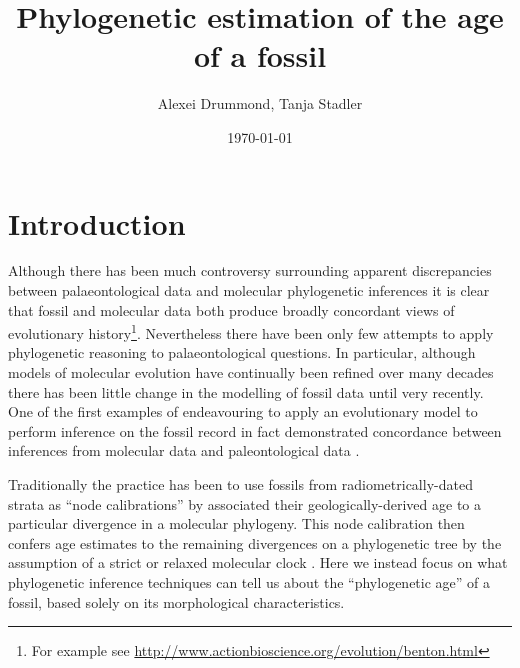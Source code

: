 \documentclass[11pt]{article}
\begin{document}
\title{Phylogenetic estimation of the age of a fossil}
\author{Alexei Drummond, Tanja Stadler}
\date{\today{}}
\maketitle

\section*{Introduction}


Although there has been much controversy surrounding apparent discrepancies between palaeontological data and molecular phylogenetic inferences it is clear that fossil and molecular data both produce broadly concordant views of evolutionary history\footnote{For example see \url{http://www.actionbioscience.org/evolution/benton.html}}. Nevertheless there have been only few attempts to apply phylogenetic reasoning to palaeontological questions. In particular, although models of molecular evolution have continually been refined over many decades there has been little change in the modelling of fossil data until very recently. One of the first examples of endeavouring to apply an evolutionary model to perform inference on the fossil record in fact demonstrated concordance between inferences from  molecular data and paleontological data \autocite{tavare2002using}. 

Traditionally the practice has been to use fossils from radiometrically-dated strata as ``node calibrations'' by associated their geologically-derived age to a particular divergence in a molecular phylogeny. This node calibration then confers age estimates to the remaining divergences on a phylogenetic tree by the assumption of a strict or relaxed molecular clock \autocite{Thorne1998,thorne2005,yang2006,Drummond2006}. 
Here we instead focus on what phylogenetic inference techniques can tell us about the ``phylogenetic age'' of a fossil, based solely on its morphological characteristics.
\end{document}

